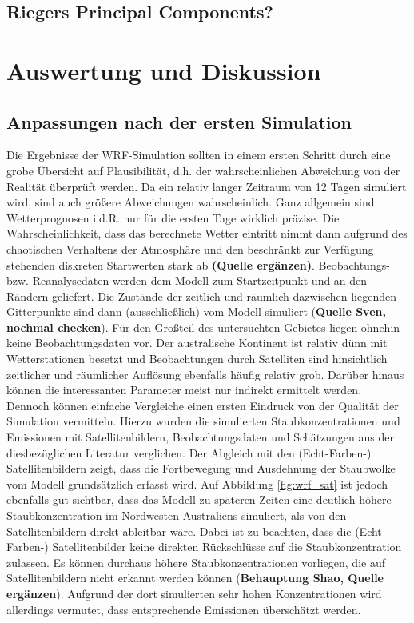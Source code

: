 \documentclass[12pt,a4paper,onecolumn]{scrartcl}
\begin{document}
\subsection{Riegers Principal Components?}

\section{Auswertung und Diskussion}
\subsection{Anpassungen nach der ersten Simulation}
Die Ergebnisse der WRF-Simulation sollten in einem ersten Schritt durch eine grobe Übersicht auf Plausibilität, d.h. der wahrscheinlichen Abweichung von der Realität überprüft werden. Da ein relativ langer Zeitraum von 12 Tagen simuliert wird, sind auch größere Abweichungen wahrscheinlich. Ganz allgemein sind Wetterprognosen i.d.R. nur für die ersten Tage wirklich präzise. Die Wahrscheinlichkeit, dass das berechnete Wetter eintritt nimmt dann aufgrund des chaotischen Verhaltens der Atmosphäre und den beschränkt zur Verfügung stehenden diskreten Startwerten stark ab \textbf{(Quelle ergänzen)}. Beobachtungs- bzw. Reanalysedaten werden dem Modell zum Startzeitpunkt und an den Rändern geliefert. Die Zustände der zeitlich und räumlich dazwischen liegenden Gitterpunkte sind dann (ausschließlich) vom Modell simuliert (\textbf{Quelle Sven, nochmal checken}). Für den Großteil des untersuchten Gebietes liegen ohnehin keine Beobachtungsdaten vor. Der australische Kontinent ist relativ dünn mit Wetterstationen besetzt und Beobachtungen durch Satelliten sind hinsichtlich  zeitlicher und räumlicher Auflösung ebenfalls häufig relativ grob. Darüber hinaus können die interessanten Parameter meist nur indirekt ermittelt werden. 
\\

Dennoch können einfache Vergleiche einen ersten Eindruck von der Qualität der Simulation vermitteln. Hierzu wurden die simulierten Staubkonzentrationen und Emissionen mit Satellitenbildern, Beobachtungsdaten und Schätzungen aus der diesbezüglichen Literatur verglichen. Der Abgleich mit den (Echt-Farben-) Satellitenbildern zeigt, dass die Fortbewegung und Ausdehnung der Staubwolke vom Modell grundsätzlich erfasst wird. Auf Abbildung \ref{fig:wrf_sat} ist jedoch ebenfalls gut sichtbar, dass das Modell zu späteren Zeiten eine deutlich höhere Staubkonzentration im Nordwesten Australiens simuliert, als von den Satellitenbildern direkt ableitbar wäre. Dabei ist zu beachten, dass die (Echt-Farben-) Satellitenbilder keine direkten Rückschlüsse auf die Staubkonzentration zulassen. Es können durchaus höhere Staubkonzentrationen vorliegen, die auf Satellitenbildern nicht erkannt werden können (\textbf{Behauptung Shao, Quelle ergänzen}). Aufgrund der dort simulierten sehr hohen Konzentrationen wird allerdings vermutet, dass entsprechende Emissionen überschätzt werden.
\end{document}
